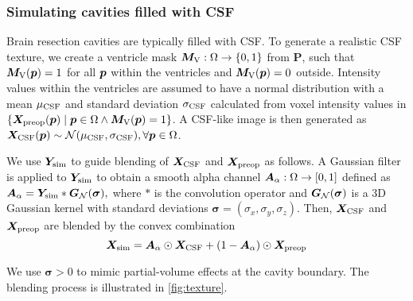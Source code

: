 \subsubsection{Simulating cavities filled with CSF}
\label{sec:texture_cavity}

Brain resection cavities are typically filled with \ac{CSF}.
To generate a realistic \acs{CSF} texture,
we create a ventricle mask
${\bm{M}_{\text{V}} : \Omega \to \{ 0, 1 \}}$ from $\bm{P}$, such that
$\bm{M}_{\text{V}}(\bm{p}) = 1$ for all $\bm{p}$ within the ventricles and
$\bm{M}_{\text{V}}(\bm{p}) = 0$ outside.
Intensity values within the ventricles are assumed to have
a normal distribution \cite{gudbjartsson_rician_1995}
with a mean $\mu_{\text{CSF}}$ and standard deviation $\sigma_{\text{CSF}}$
calculated from voxel intensity values in
$\{ \bm{X}_{\text{preop}}(\bm{p}) \mid \bm{p} \in \Omega \land \bm{M}_{\text{V}}(\bm{p}) = 1 \}$.
A \acs{CSF}-like image is then generated as $\bm{X}_{\text{CSF}}(\bm{p}) \sim \mathcal{N} (\mu_{\text{CSF}}, \sigma_{\text{CSF}}), \forall \bm{p} \in \Omega$.


We use $\bm{Y}_{\text{sim}}$ to guide blending of $\bm{X}_{\text{CSF}}$ and $\bm{X}_{\text{preop}}$ as follows.
A Gaussian filter is applied to $\bm{Y}_{\text{sim}}$ to obtain a smooth alpha channel $\bm{A}_\alpha : \Omega \to [0, 1]$ defined as
$
  \bm{A}_\alpha
  = \bm{Y}_{\text{sim}}
  * \bm{G}_{\mathcal{N}}(\bm{\sigma}),
$
where
$*$ is the convolution operator
and $\bm{G}_{\mathcal{N}}(\bm{\sigma})$ is a 3D Gaussian kernel with standard deviations
$\bm{\sigma} = (\sigma_x, \sigma_y, \sigma_z)$.
Then, $\bm{X}_{\text{CSF}}$ and $\bm{X}_{\text{preop}}$ are blended by the convex combination
\begin{equation}
  \bm{X}_{\text{sim}}
  = \bm{A}_\alpha \odot \bm{X}_{\text{CSF}}
  + (1 - \bm{A}_\alpha) \odot \bm{X}_{\text{preop}}
\end{equation}

We use $\bm{\sigma} > 0$ to mimic partial-volume effects at the cavity boundary.
The blending process is illustrated in \cref{fig:texture}.


